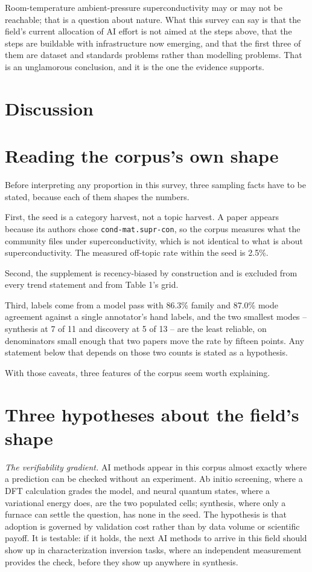 \documentclass[
  11pt,
]{article}
\newcounter{none} %
\begin{document}
Room-temperature ambient-pressure superconductivity may or may not be
reachable; that is a question about nature. What this survey can say is
that the field's current allocation of AI effort is not aimed at the
steps above, that the steps are buildable with infrastructure now
emerging, and that the first three of them are dataset and standards
problems rather than modelling problems. That is an unglamorous
conclusion, and it is the one the evidence supports.

\section{Discussion}\label{discussion}

\section{Reading the corpus's own
shape}\label{reading-the-corpuss-own-shape}

Before interpreting any proportion in this survey, three sampling facts
have to be stated, because each of them shapes the numbers.

First, the seed is a category harvest, not a topic harvest. A paper
appears because its authors chose \texttt{cond-mat.supr-con}, so the
corpus measures what the community files under superconductivity, which
is not identical to what is about superconductivity. The measured
off-topic rate within the seed is 2.5\%.

Second, the supplement is recency-biased by construction and is excluded
from every trend statement and from Table 1's grid.

Third, labels come from a model pass with 86.3\% family and 87.0\% mode
agreement against a single annotator's hand labels, and the two smallest
modes -- synthesis at 7 of 11 and discovery at 5 of 13 -- are the least
reliable, on denominators small enough that two papers move the rate by
fifteen points. Any statement below that depends on those two counts is
stated as a hypothesis.

With those caveats, three features of the corpus seem worth explaining.

\section{Three hypotheses about the field's
shape}\label{three-hypotheses-about-the-fields-shape}

\emph{The verifiability gradient.} AI methods appear in this corpus
almost exactly where a prediction can be checked without an experiment.
Ab initio screening, where a DFT calculation grades the model, and
neural quantum states, where a variational energy does, are the two
populated cells; synthesis, where only a furnace can settle the
question, has none in the seed. The hypothesis is that adoption is
governed by validation cost rather than by data volume or scientific
payoff. It is testable: if it holds, the next AI methods to arrive in
this field should show up in characterization inversion tasks, where an
independent measurement provides the check, before they show up anywhere
in synthesis.
\end{document}
